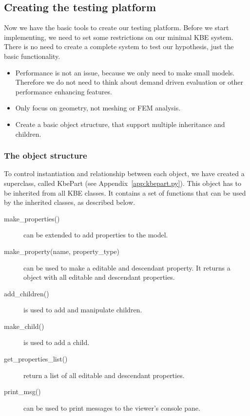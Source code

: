 \subsection{Creating the testing platform} %
\label{sub:the_creating_the_testing_platform}
Now we have the basic tools to create our testing platform. Before we start implementing, we need to set some restrictions on our minimal KBE system. There is no need to create a complete system to test our hypothesis, just the basic functionality.

\begin{itemize}
  \item Performance is not an issue, because we only need to make small models. Therefore we do not need to think about demand driven evaluation or other performance enhancing features.

  \item Only focus on geometry, not meshing or FEM analysis.

  \item Create a basic object structure, that support multiple inheritance and children.
\end{itemize}


\subsubsection{The object structure} %
\label{ssub:the_object_structure}
To control instantiation and relationship between each object, we have created a superclass, called KbePart (see Appendix~\ref{app:kbepart.py}). This object has to be inherited from all KBE classes. It contains a set of functions that can be used by the inherited classes, as described below.

\begin{description}
  \item[make\_properties()]  can be extended to add properties to the model.

  \item[make\_property(name, property\_type)] can be used to make a editable and descendant property. It returns a object with all editable and descendant properties.

  \item [add\_children()] is used to add and manipulate children.

  \item[make\_child()] is used to add a child.

  \item[get\_properties\_list()] return a list of all editable and descendant properties.

  \item[print\_msg()] can be used to print messages to the viewer's console pane.
\end{description}

